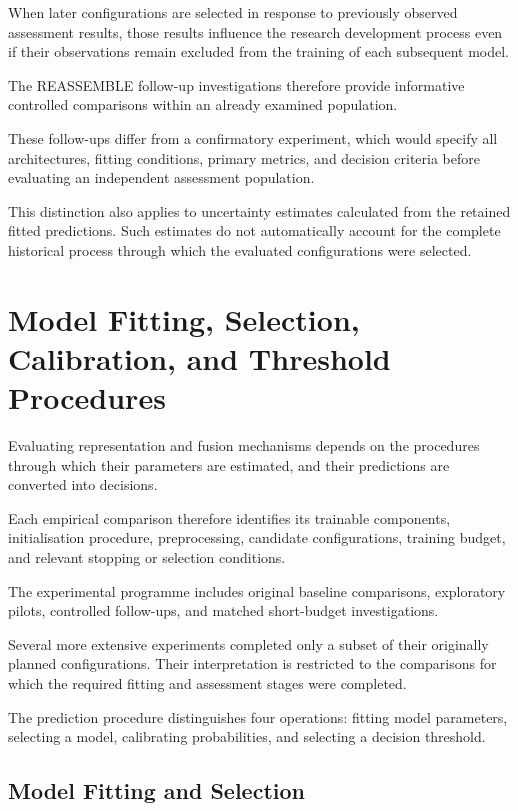 When later configurations are selected in response to previously observed assessment results, those results influence the research development process even if their observations remain excluded from the training of each subsequent model.

The REASSEMBLE follow-up investigations therefore provide informative controlled comparisons within an already examined population.

These follow-ups differ from a confirmatory experiment, which would specify all architectures, fitting conditions, primary metrics, and decision criteria before evaluating an independent assessment population.

This distinction also applies to uncertainty estimates calculated from the retained fitted predictions. Such estimates do not automatically account for the complete historical process through which the evaluated configurations were selected.

\section{Model Fitting, Selection, Calibration, and Threshold Procedures}
\label{sec:ch4-fitting}

Evaluating representation and fusion mechanisms depends on the procedures through which their parameters are estimated, and their predictions are converted into decisions.

Each empirical comparison therefore identifies its trainable components, initialisation procedure, preprocessing, candidate configurations, training budget, and relevant stopping or selection conditions.

The experimental programme includes original baseline comparisons, exploratory pilots, controlled follow-ups, and matched short-budget investigations.

Several more extensive experiments completed only a subset of their originally planned configurations. Their interpretation is restricted to the comparisons for which the required fitting and assessment stages were completed.

The prediction procedure distinguishes four operations: fitting model parameters, selecting a model, calibrating probabilities, and selecting a decision threshold.

\subsection{Model Fitting and Selection}

